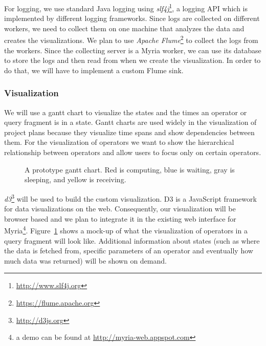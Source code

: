\documentclass[11pt]{article}
\begin{document}

For logging, we use standard Java logging using \emph{slf4j}\footnote{\url{http://www.slf4j.org}}, a logging API which is implemented by different logging frameworks. Since logs are collected on different workers, we need to collect them on one machine that analyzes the data and creates the visualizations. We plan to use \emph{Apache Flume}\footnote{\url{https://flume.apache.org}} to collect the logs from the workers. Since the collecting server is a Myria worker, we can use its database to store the logs and then read from when we create the visualization. In order to do that, we will have to implement a custom Flume sink.


	\subsubsection{Visualization}
  \label{sec:visualization}

	We will use a gantt chart to visualize the states and the times an operator or query fragment is in a state. Gantt charts are used widely in the visualization of project plans because they visualize time spans and show dependencies between them. For the visualization of operators we want to show the hierarchical relationship between operators and allow users to focus only on certain operators.

\begin{figure}[h]
  \begin{center}
    \def\svgwidth{0.9\columnwidth}
    
  \end{center}
  \caption{A prototype gantt chart. Red is computing, blue is waiting, gray is sleeping, and yellow is receiving.}
  \label{fig:gantt}
\end{figure}

	\emph{d3}\footnote{\url{http://d3js.org}} will be used to build the custom visualization. D3 is a JavaScript framework for data visualizations on the web. Consequently, our visualization will be browser based and we plan to integrate it in the existing web interface for Myria\footnote{a demo can be found at \url{http://myria-web.appspot.com}}. Figure~\ref{fig:gantt} shows a mock-up of what the visualization of operators in a query fragment will look like. Additional information about states (such as where the data is fetched from, specific parameters of an operator and eventually how much data was returned) will be shown on demand.
\end{document}
